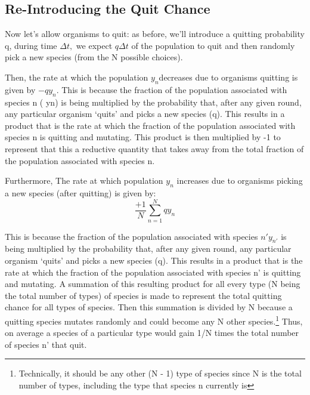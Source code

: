\documentclass[border=1pt]{article}
\begin{document}
\subsection{Re-Introducing the Quit Chance}
Now let's allow organisms to quit: as before, we'll introduce a quitting probability q, during time $\Delta t,$ we expect $q \Delta t$ of the population to quit and then randomly pick a new species (from the N possible choices).

Then, the rate at which the population $y_n$decreases due to organisms quitting is given by $-q y_{n}$. This is because the fraction of the population associated with species n ( yn) is being multiplied by the probability that, after any given round, any particular organism ‘quits’ and picks a new species (q). This results in a product that is the rate at which the fraction of the population associated with species n is quitting and mutating. This product is then multiplied by -1 to represent that this a reductive quantity that takes away from the total fraction of the population associated with species n.

Furthermore, The rate at which population $y_n$ increases due to organisms picking a new species (after quitting) is given by:
\begin{equation}
\frac{+1}{N} \sum_{n=1}^{N} q y_{n}
\end{equation}

This is because the fraction of the population associated with species $n \prime y_{n \prime}$  is being multiplied by the probability that, after any given round, any particular organism ‘quits’ and picks a new species (q). This results in a product that is the rate at which the fraction of the population associated with species n’ is quitting and mutating. A summation of this resulting product for all every type (N being the total number of types) of species is made to represent the total quitting chance for all types of species. Then this summation is divided by N because a quitting species mutates randomly and could become any N other species.\footnote{Technically, it should be any other (N - 1) type of species since N is the total number of types, including the type that species n currently is} Thus, on average a species of a particular type would gain 1/N times the total number of species n’ that quit.
\end{document}

